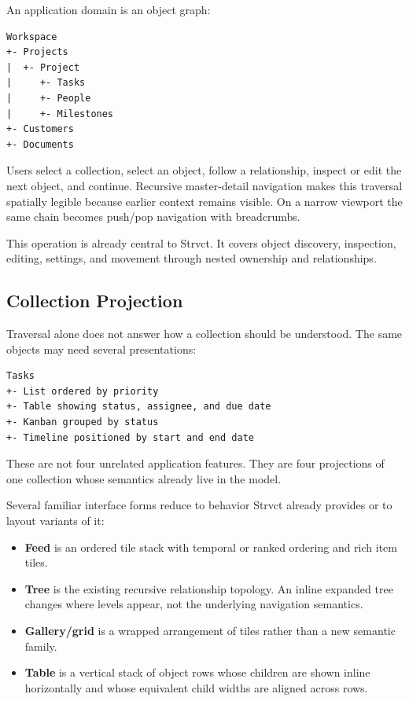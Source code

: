 \documentclass[sigplan,review,anonymous,10pt]{acmart}
\begin{document}
An application domain is an object graph:

\begin{verbatim}
Workspace
+- Projects
|  +- Project
|     +- Tasks
|     +- People
|     +- Milestones
+- Customers
+- Documents
\end{verbatim}

Users select a collection, select an object, follow a relationship, inspect or edit the next object, and continue. Recursive master-detail navigation makes this traversal spatially legible because earlier context remains visible. On a narrow viewport the same chain becomes push/pop navigation with breadcrumbs.

This operation is already central to Strvct. It covers object discovery, inspection, editing, settings, and movement through nested ownership and relationships.

\subsection{Collection Projection}
\label{sec:projection}

Traversal alone does not answer how a collection should be understood. The same objects may need several presentations:

\begin{verbatim}
Tasks
+- List ordered by priority
+- Table showing status, assignee, and due date
+- Kanban grouped by status
+- Timeline positioned by start and end date
\end{verbatim}

These are not four unrelated application features. They are four projections of one collection whose semantics already live in the model.

Several familiar interface forms reduce to behavior Strvct already provides or to layout variants of it:

\begin{itemize}
\item \textbf{Feed} is an ordered tile stack with temporal or ranked ordering and rich item tiles.
\item \textbf{Tree} is the existing recursive relationship topology. An inline expanded tree changes where levels appear, not the underlying navigation semantics.
\item \textbf{Gallery/grid} is a wrapped arrangement of tiles rather than a new semantic family.
\item \textbf{Table} is a vertical stack of object rows whose children are shown inline horizontally and whose equivalent child widths are aligned across rows.
\end{itemize}
\end{document}
